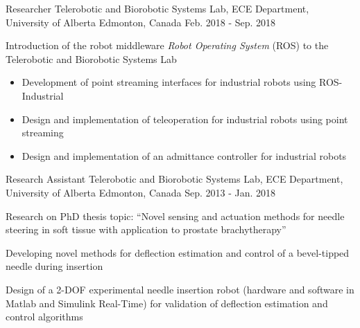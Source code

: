 \begin{cventries}
  \cventry
    {Researcher} %
    {Telerobotic and Biorobotic Systems Lab, ECE Department, University of Alberta} %
    {Edmonton, Canada} %
    {Feb. 2018 - Sep. 2018} %
    {
      \begin{cvitems}
        \item {Introduction of the robot middleware \emph{Robot Operating System} (ROS) to the Telerobotic and Biorobotic Systems Lab}
        \begin{itemize}
          \item {Development of point streaming interfaces for industrial robots using ROS-Industrial}
          \item {Design and implementation of teleoperation for industrial robots using point streaming}
          \item {Design and implementation of an admittance controller for industrial robots}
        \end{itemize}
      \end{cvitems}
    }

  \cventry
    {Research Assistant} %
    {Telerobotic and Biorobotic Systems Lab, ECE Department, University of Alberta} %
    {Edmonton, Canada} %
    {Sep. 2013 - Jan. 2018} %
    {
      \begin{cvitems} %
        \item{Research on PhD thesis topic: ``Novel sensing and actuation methods for needle steering in soft tissue with application to prostate brachytherapy''}
        \item{Developing novel methods for deflection estimation and control of a bevel-tipped needle during insertion}
        \item{Design of a 2-DOF experimental needle insertion robot (hardware and software in Matlab and Simulink Real-Time) for validation of deflection estimation and control algorithms}
      \end{cvitems}
    }


\end{cventries}
